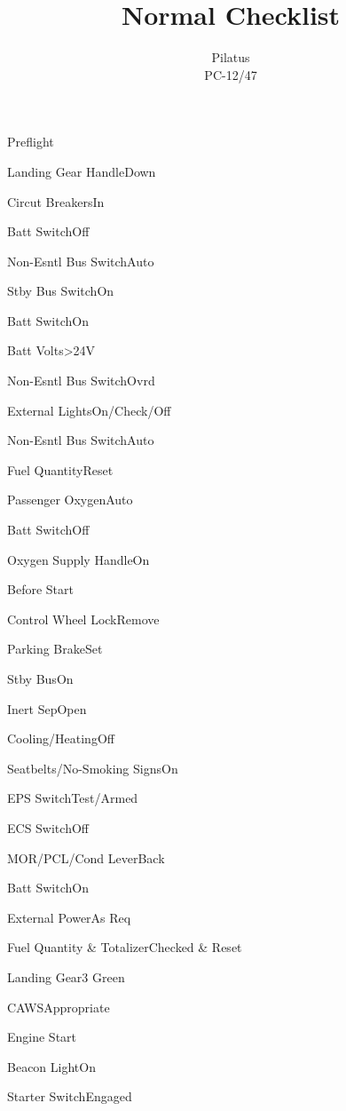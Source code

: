 \documentclass[sim-use, halfpage]{checklist}
\title{Normal Checklist}
\subtitle{Pilatus \\ PC-12/47}
\begin{document}
  

\begin{checklist}{Preflight}
  \item{Landing Gear Handle}{Down}
  \item{Circut Breakers}{In}
  \item{Batt Switch}{Off}
  \item{Non-Esntl Bus Switch}{Auto}
  \item{Stby Bus Switch}{On}
  \item{Batt Switch}{On}
  \item{Batt Volts}{>24V}
  \item{Non-Esntl Bus Switch}{Ovrd}
  \item{External Lights}{On/Check/Off}
  \item{Non-Esntl Bus Switch}{Auto}
  \item{Fuel Quantity}{Reset}
  \item{Passenger Oxygen}{Auto}
  \item{Batt Switch}{Off}
  \item{Oxygen Supply Handle}{On}
\end{checklist}

\begin{checklist}{Before Start}
  \item{Control Wheel Lock}{Remove}
  \item{Parking Brake}{Set}
  \item{Stby Bus}{On}
  \item{Inert Sep}{Open}
  \item{Cooling/Heating}{Off}
  \item{Seatbelts/No-Smoking Signs}{On}
  \item{EPS Switch}{Test/Armed}
  \item{ECS Switch}{Off}
  \item{MOR/PCL/Cond Lever}{Back}
  \item{Batt Switch}{On}
  \item{External Power}{As Req}
  \item{Fuel Quantity \& Totalizer}{Checked \& Reset}
  \item{Landing Gear}{3 Green}
  \item{CAWS}{Appropriate}
\end{checklist}
  
\begin{checklist}{Engine Start}
  \item{Beacon Light}{On}
  \item{Starter Switch}{Engaged}
\end{checklist}
\end{document}
